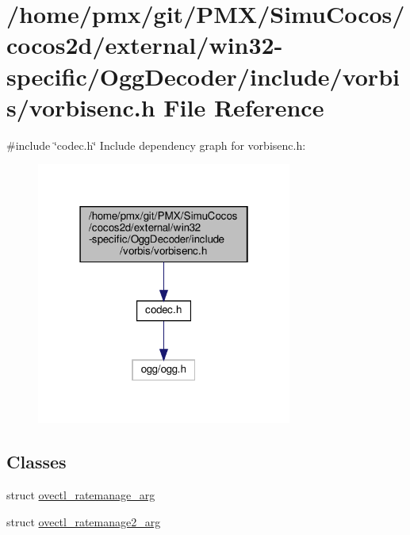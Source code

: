 \hypertarget{cocos2d_2external_2win32-specific_2OggDecoder_2include_2vorbis_2vorbisenc_8h}{}\section{/home/pmx/git/\+P\+M\+X/\+Simu\+Cocos/cocos2d/external/win32-\/specific/\+Ogg\+Decoder/include/vorbis/vorbisenc.h File Reference}
\label{cocos2d_2external_2win32-specific_2OggDecoder_2include_2vorbis_2vorbisenc_8h}
{\ttfamily \#include \char`\"{}codec.\+h\char`\"{}}\newline
Include dependency graph for vorbisenc.\+h\+:
\nopagebreak
\begin{figure}[H]
\begin{center}
\leavevmode
\includegraphics[width=238pt]{cocos2d_2external_2win32-specific_2OggDecoder_2include_2vorbis_2vorbisenc_8h__incl}
\end{center}
\end{figure}
\subsection*{Classes}
\begin{DoxyCompactItemize}
\item 
struct \hyperlink{structovectl__ratemanage__arg}{ovectl\+\_\+ratemanage\+\_\+arg}
\item 
struct \hyperlink{structovectl__ratemanage2__arg}{ovectl\+\_\+ratemanage2\+\_\+arg}
\end{DoxyCompactItemize}
